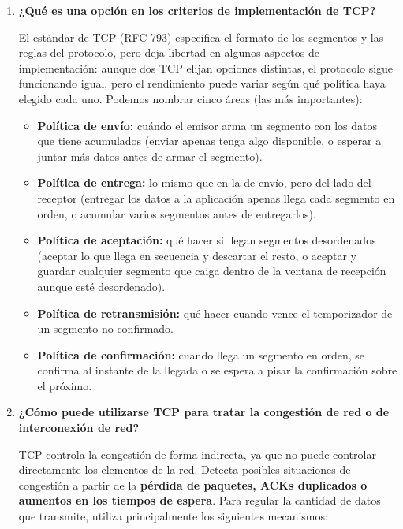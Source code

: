 \documentclass[11pt,a4paper]{article}
\begin{document}
\begin{enumerate}[label=20.\arabic*, start=1, itemsep=0.3cm]
  La diferencia es que el forzado busca evitar la espera por acumulación de datos, mientras que la urgencia señala que una parte de los datos requiere atención especial.

  \item
  \textbf{¿Qué es una opción en los criterios de implementación de TCP?}

  El estándar de TCP (RFC 793) especifica el formato de los segmentos y las reglas del protocolo, pero deja libertad en algunos aspectos de implementación: aunque dos TCP elijan opciones distintas, el protocolo sigue funcionando igual, pero el rendimiento puede variar según qué política haya elegido cada uno. Podemos nombrar cinco áreas (las más importantes):
\begin{itemize}
      \item \textbf{Política de envío:} cuándo el emisor arma un segmento con los datos que tiene acumulados (enviar apenas tenga algo disponible, o esperar a juntar más datos antes de armar el segmento).
      \item \textbf{Política de entrega:} lo mismo que en la de envío, pero del lado del receptor (entregar los datos a la aplicación apenas llega cada segmento en orden, o acumular varios segmentos antes de entregarlos).
      \item \textbf{Política de aceptación:} qué hacer si llegan segmentos desordenados (aceptar lo que llega en secuencia y descartar el resto, o aceptar y guardar cualquier segmento que caiga dentro de la ventana de recepción aunque esté desordenado).
      \item \textbf{Política de retransmisión:} qué hacer cuando vence el temporizador de un segmento no confirmado.
      \item \textbf{Política de confirmación:} cuando llega un segmento en orden, se confirma al instante de la llegada o se espera a pisar la confirmación sobre el próximo.
  \end{itemize}

  \item
   \textbf{¿Cómo puede utilizarse TCP para tratar la congestión de red o de interconexión de red?}

TCP controla la congestión de forma indirecta, ya que no puede controlar directamente los elementos de la red. Detecta posibles situaciones de congestión a partir de la \textbf{pérdida de paquetes, ACKs duplicados o aumentos en los tiempos de espera}. Para regular la cantidad de datos que transmite, utiliza principalmente los siguientes mecanismos:


\end{enumerate}
\end{document}
